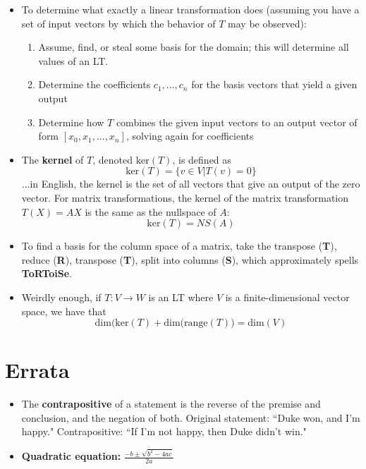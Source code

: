 \documentclass[10pt,letterpaper]{article}
\begin{document}
\begin{itemize}
\item To determine what exactly a linear transformation does (assuming you have a set of input vectors by which the behavior of $T$ may be observed): 
\begin{enumerate} 
\item Assume, find, or steal some basis for the domain; this will determine all values of an LT. 
\item Determine the coefficients $c_1, ...,c_n$ for the basis vectors that yield a given output 
\item Determine how $T$ combines the given input vectors to an output vector of form  $[x_0,x_1,...,x_n]$, solving again for coefficients
\end{enumerate}

\item The \textbf{kernel} of $T$, denoted $\mbox{ker}(T)$, is defined as 
$$\mbox{ker}(T)=\{ v\in V | T(v)=0\}$$ 
...in English, the kernel is the set of all vectors that give an output of the zero vector. For matrix transformations, the kernel of the matrix transformation $T(X)=AX$ is the same as the nullspace of $A$: 
$$\mbox{ker}(T)=NS(A)$$ %

\item To find a basis for the column space of a matrix, take the transpose (\textbf{T}), reduce (\textbf{R}), transpose (\textbf{T}), split into columns (\textbf{S}), which approximately spells \textbf{ToRToiSe}.

\item Weirdly enough, if $T : V \to W$ is an LT where $V$ is a finite-dimensional vector space, we have that 
$$\mbox{dim(ker}(T)+\mbox{dim(range}(T)) = \mbox{dim}(V)$$

\end{itemize}

\section*{Errata} 

\begin{itemize}
\item The \textbf{contrapositive }of a statement is the reverse of the premise and conclusion, and the negation of both. Original statement: ``Duke won, and I'm happy." Contrapositive: ``If I'm not happy, then Duke didn't win."
\item \textbf{Quadratic equation:} $\frac{-b\pm \sqrt{b^2-4ac}}{2a}$ 
\end{itemize}
\end{document}
